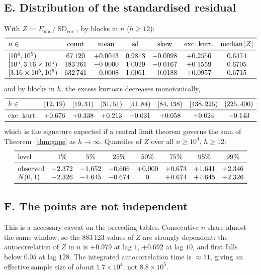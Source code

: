 \documentclass[11pt]{amsart}
\theoremstyle{definition}
\begin{document}
\subsection*{E. Distribution of the standardised residual}
With $Z:=E_{\mathrm{mid}}/\operatorname{SD}_{\mathrm{cov}}$, by blocks in $n$
($h\ge12$):
\[
\begin{array}{lcccccc}
\toprule
n\in & \text{count} & \operatorname{mean} & \operatorname{sd} & \text{skew} & \text{exc.\ kurt.} & \operatorname{median}|Z|\\
\midrule
{}[10^{4},10^{5}) & 67\,120 & +0.0043 & 0.9813 & -0.0098 & +0.2556 & 0.6474\\
{}[10^{5},3.16\times10^{5}) & 183\,261 & -0.0000 & 1.0029 & -0.0167 & +0.1559 & 0.6705\\
{}[3.16\times10^{5},10^{6}) & 632\,741 & -0.0008 & 1.0061 & -0.0188 & +0.0957 & 0.6715\\
\bottomrule
\end{array}
\]
and by blocks in $h$, the excess kurtosis decreases monotonically,
\[
\begin{array}{lccccccc}
\toprule
h\in & [12,19) & [19,31) & [31,51) & [51,84) & [84,138) & [138,225) & [225,400)\\
\midrule
\text{exc.\ kurt.} & +0.676 & +0.338 & +0.213 & +0.031 & +0.058 & +0.024 & -0.143\\
\bottomrule
\end{array}
\]
which is the signature expected if a central limit theorem governs the sum of
Theorem~\ref{thm:gaps} as $h\to\infty$. Quantiles of $Z$ over all $n\ge10^{4}$,
$h\ge12$:
\[
\begin{array}{lccccccc}
\toprule
\text{level} & 1\% & 5\% & 25\% & 50\% & 75\% & 95\% & 99\%\\
\midrule
\text{observed} & -2.372 & -1.652 & -0.666 & +0.000 & +0.673 & +1.641 & +2.346\\
N(0,1) & -2.326 & -1.645 & -0.674 & 0 & +0.674 & +1.645 & +2.326\\
\bottomrule
\end{array}
\]

\subsection*{F. The points are not independent}
This is a necessary caveat on the preceding tables. Consecutive $n$ share almost
the same window, so the $883\,123$ values of $Z$ are strongly dependent: the
autocorrelation of $Z$ in $n$ is $+0.979$ at lag $1$, $+0.692$ at lag $10$, and
first falls below $0.05$ at lag $128$. The integrated autocorrelation time is
$\approx51$, giving an effective sample size of about $1.7\times10^{4}$, not
$8.8\times10^{5}$.
\end{document}
